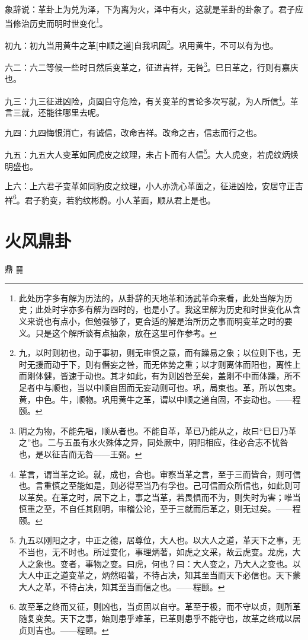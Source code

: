 \documentclass[12pt,oneside]{book}
\begin{document}
象辞说：革卦上为兑为泽，下为离为火，泽中有火，这就是革卦的卦象了。君子应当修治历史而明时世变化\footnote{此处历字多有解为历法的，从卦辞的天地革和汤武革命来看，此处当解为历史；此处时字亦多有解为四时的，也是小了。我这里解为历史和时世变化从含义来说也有点小，但勉强够了，更合适的解是治所历之事而明变革之时的要义。只是这个解所谈有点抽象，放在这里可作参考。}。

初九：初九当用黄牛之革[中顺之道]自我巩固\footnote{九，以时则初也，动于事初，则无审慎之意，而有躁易之象；以位则下也，无时无援而动于下，则有僭妄之咎，而无体势之重；以才则离体而阳也，离性上而刚体健，皆速于动也。其才如此，有为则凶咎至矣，盖刚不中而体躁，所不足者中与顺也，当以中顺自固而无妄动则可也。巩，局束也。革，所以包束。黄，中色。牛，顺物。巩用黄牛之革，谓以中顺之道自固，不妄动也。——程颐。}。巩用黄牛，不可以有为也。


六二：六二等候一些时日然后变革之，征进吉祥，无咎\footnote{阴之为物，不能先唱，顺从者也。不能自革，革已乃能从之，故曰“巳日乃革之”也。二与五虽有水火殊体之异，同处厥中，阴阳相应，往必合志不忧咎也，是以征吉而无咎——王弼。}。巳日革之，行则有嘉庆也。

九三：九三征进凶险，贞固自守危险，有关变革的言论多次写就，为人所信\footnote{革言，谓当革之论。就，成也，合也。审察当革之言，至于三而皆合，则可信也。言重慎之至能如是，则必得至当乃有孚也。己可信而众所信也，如此则可以革矣。在革之时，居下之上，事之当革，若畏惧而不为，则失时为害；唯当慎重之至，不自任其刚明，审稽公论，至于三就而后革之，则无过矣。——程颐。}。革言三就，还能往哪里去呢。

九四：九四悔恨消亡，有诚信，改命吉祥。改命之吉，信志而行之也。

九五：九五大人变革如同虎皮之纹理，未占卜而有人信\footnote{九五以刚阳之才，中正之德，居尊位，大人也。以大人之道，革天下之事，无不当也，无不时也。所过变化，事理炳著，如虎之文采，故云虎变。龙虎，大人之象也。变者，事物之变。曰虎，何也？曰：大人变之，乃大人之变也。以大人中正之道变革之，炳然昭著，不待占决，知其至当而天下必信也。天下蒙大人之革，不待占决，知其至当而信之也。——程颐。}。大人虎变，若虎纹炳焕明盛也。

上六：上六君子变革如同豹皮之纹理，小人亦洗心革面之，征进凶险，安居守正吉祥\footnote{故至革之终而又征，则凶也，当贞固以自守。革至于极，而不守以贞，则所革随复变矣。天下之事，始则患乎难革，已革则患乎不能守也，故革之终戒以居贞则吉也。——程颐。}。君子豹变，若豹纹彬蔚。小人革面，顺从君上是也。


\chapter{火风鼎卦}
鼎 {\large ䷱}
\end{document}
